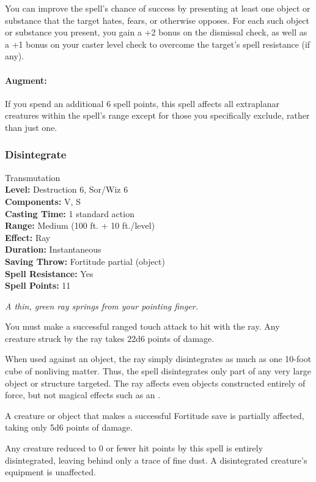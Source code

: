 You can improve the spell's chance of success by presenting at least one object or substance that the target hates, fears, or otherwise opposes. 
For each such object or substance you present, you gain a +2 bonus on the dismissal check, as well as a +1 bonus on your caster level check to overcome the target's spell resistance (if any).

\paragraph{Augment:} If you spend an additional 6 spell points, this spell affects all extraplanar creatures within the spell's range except for those you specifically exclude, rather than just one.
\subsubsection{Disintegrate}
\label{Spell:Disintegrate}
Transmutation
\\ \textbf{Level:} Destruction 6, Sor/Wiz 6
\\ \textbf{Components:} V, S
\\ \textbf{Casting Time:} 1 standard action
\\ \textbf{Range:} Medium (100 ft. + 10 ft./level)
\\ \textbf{Effect:} Ray
\\ \textbf{Duration:} Instantaneous
\\ \textbf{Saving Throw:} Fortitude partial (object)
\\ \textbf{Spell Resistance:} Yes
\\ \textbf{Spell Points:} 11

\emph{A thin, green ray springs from your pointing finger. }

You must make a successful ranged touch attack to hit with the ray.
Any creature struck by the ray takes 22d6 points of damage. 

When used against an object, the ray simply disintegrates as much as one 10-foot cube of nonliving matter. 
Thus, the spell disintegrates only part of any very large object or structure targeted. 
The ray affects even objects constructed entirely of force, but not magical effects such as an .

A creature or object that makes a successful Fortitude save is partially affected, taking only 5d6 points of damage.

Any creature reduced to 0 or fewer hit points by this spell is entirely disintegrated, leaving behind only a trace of fine dust. 
A disintegrated creature's equipment is unaffected.

